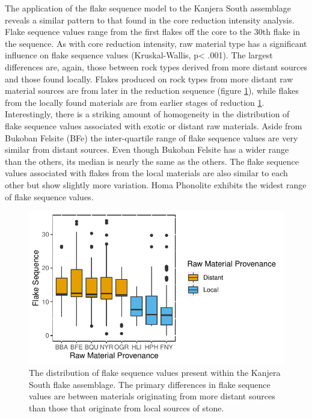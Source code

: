 \documentclass[]{elsarticle} %
\makeatletter
\def\maxwidth{\ifdim\Gin@nat@width>\linewidth\linewidth
\else\Gin@nat@width\fi}
\let\Oldincludegraphics\includegraphics
\renewcommand{\includegraphics}[1]{\Oldincludegraphics[width=\maxwidth]{#1}}
\makeatother
\begin{document}
The application of the flake sequence model to the Kanjera South
assemblage reveals a similar pattern to that found in the core reduction
intensity analysis. Flake sequence values range from the first flakes
off the core to the 30th flake in the sequence. As with core reduction
intensity, raw material type has a significant influence on flake
sequence values (Kruskal-Wallis, p\textless{} .001). The largest
differences are, again, those between rock types derived from more
distant sources and those found locally. Flakes produced on rock types
from more distant raw material sources are from later in the reduction
sequence (figure \ref{flake_seq_rm}), while flakes from the locally
found materials are from earlier stages of reduction \ref{flake_seq_rm}.
Interestingly, there is a striking amount of homogeneity in the
distribution of flake sequence values associated with exotic or distant
raw materials. Aside from Bukoban Felsite (BFe) the inter-quartile range
of flake sequence values are very similar from distant sources. Even
though Bukoban Felsite has a wider range than the others, its median is
nearly the same as the others. The flake sequence values associated with
flakes from the local materials are also similar to each other but show
slightly more variation. Homa Phonolite exhibits the widest range of
flake sequence values.

\begin{figure}
\centering
\includegraphics{Reeves_Braun_et_al_2020_Kanjera_South_JHE_files/figure-latex/unnamed-chunk-6-1.pdf}
\caption{The distribution of flake sequence values present within the
Kanjera South flake assemblage. The primary differences in flake
sequence values are between materials originating from more distant
sources than those that originate from local sources of stone.
\label{flake_seq_rm}}
\end{figure}
\end{document}
